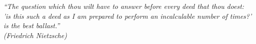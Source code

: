 \documentclass[
	12pt,				%
	oneside,
	a4paper,			%
	chapter=TITLE,
	brazil,				%
	english,			%
	]{abntex2}
\begin{document}

\frenchspacing 

\pretextual

\imprimircapa

\imprimirfolhaderosto



\begin{dedicatoria}
	\vspace*{\fill}
	\centering
	\noindent
	\textit{}
	 \vspace*{\fill}
\end{dedicatoria}



\begin{epigrafe}
	\vspace*{\fill}
	\begin{flushright}
		\textit{``The question which thou wilt have to answer before every deed that thou doest: 'is this such a deed as I am prepared to perform an incalculable number of times?' is the best ballast.''\\
			(Friedrich Nietzsche)}
	\end{flushright}
\end{epigrafe}



\listoffigures*
\cleardoublepage

\listoftables*
\cleardoublepage
\end{document}
